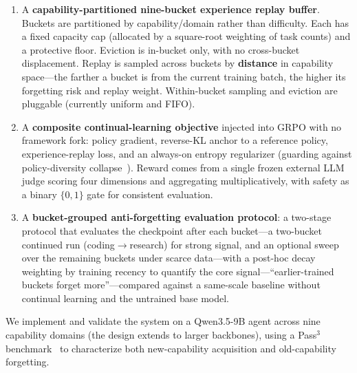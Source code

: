 \begin{enumerate}
  \item A \textbf{capability-partitioned nine-bucket experience replay buffer}. Buckets are partitioned by capability/domain rather than difficulty. Each has a fixed capacity cap (allocated by a square-root weighting of task counts) and a protective floor. Eviction is in-bucket only, with no cross-bucket displacement. Replay is sampled across buckets by \textbf{distance} in capability space---the farther a bucket is from the current training batch, the higher its forgetting risk and replay weight. Within-bucket sampling and eviction are pluggable (currently uniform and FIFO).

  \item A \textbf{composite continual-learning objective} injected into GRPO with no framework fork: policy gradient, reverse-KL anchor to a reference policy, experience-replay loss, and an always-on entropy regularizer (guarding against policy-diversity collapse~\cite{B4}). Reward comes from a single frozen external LLM judge scoring four dimensions and aggregating multiplicatively, with safety as a binary $\{0,1\}$ gate for consistent evaluation.

  \item A \textbf{bucket-grouped anti-forgetting evaluation protocol}: a two-stage protocol that evaluates the checkpoint after each bucket---a two-bucket continued run (coding$\rightarrow$research) for strong signal, and an optional sweep over the remaining buckets under scarce data---with a post-hoc decay weighting by training recency to quantify the core signal---``earlier-trained buckets forget more''---compared against a same-scale baseline without continual learning and the untrained base model.
\end{enumerate}

We implement and validate the system on a Qwen3.5-9B agent across nine capability domains (the design extends to larger backbones), using a Pass$^3$ benchmark~\cite{C1} to characterize both new-capability acquisition and old-capability forgetting.
